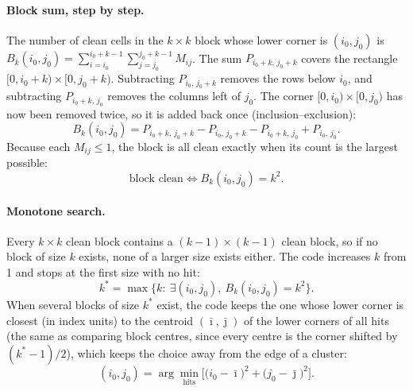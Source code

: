 \paragraph{Block sum, step by step.}
The number of clean cells in the $k\times k$ block whose lower corner is $(i_0,j_0)$ is
$B_k(i_0,j_0)=\sum_{i=i_0}^{i_0+k-1}\sum_{j=j_0}^{j_0+k-1}M_{ij}$.
The sum $P_{i_0+k,\,j_0+k}$ covers the rectangle $[0,i_0+k)\times[0,j_0+k)$.
Subtracting $P_{i_0,\,j_0+k}$ removes the rows below $i_0$, and subtracting $P_{i_0+k,\,j_0}$ removes the
columns left of $j_0$.
The corner $[0,i_0)\times[0,j_0)$ has now been removed twice, so it is added back once
(inclusion--exclusion):
\begin{equation}
  B_k(i_0,j_0) = P_{i_0+k,\,j_0+k} - P_{i_0,\,j_0+k} - P_{i_0+k,\,j_0} + P_{i_0,\,j_0}.
  \label{eq:robust_spec-block}
\end{equation}
Because each $M_{ij}\le1$, the block is all clean exactly when its count is the largest possible:
\begin{equation}
  \text{block clean} \iff B_k(i_0,j_0) = k^2 .
  \label{eq:robust_spec-allclean}
\end{equation}

\paragraph{Monotone search.}
Every $k\times k$ clean block contains a $(k-1)\times(k-1)$ clean block, so if no block of size $k$
exists, none of a larger size exists either.
The code increases $k$ from 1 and stops at the first size with no hit:
\begin{equation}
  k^\ast = \max\{k:\ \exists (i_0,j_0),\ B_k(i_0,j_0)=k^2\}.
  \label{eq:robust_spec-kstar}
\end{equation}
When several blocks of size $k^\ast$ exist, the code keeps the one whose lower corner is closest (in
index units) to the centroid $(\bar\imath,\bar\jmath)$ of the lower corners of all hits (the same as
comparing block centres, since every centre is the corner shifted by $(k^\ast-1)/2$), which keeps the
choice away from the edge of a cluster:
\begin{equation}
  (i_0,j_0) = \arg\min_{\text{hits}} \Big[\big(i_0-\bar\imath\big)^2
              + \big(j_0-\bar\jmath\big)^2\Big].
  \label{eq:robust_spec-tie}
\end{equation}

